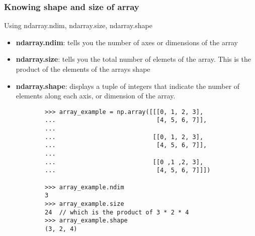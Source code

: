 \documentclass[12pt, a4paper]{article}
\begin{document}
\subsubsection{Knowing shape and size of array}
Using ndarray.ndim, ndarray.size, ndarray.shape

\begin{itemize}
    \item \textbf{ndarray.ndim}: tells you the number of axes or dimensions of the array
    \item \textbf{ndarray.size}: tells you the total number of elemets of the array. This is the product of the elements of the arrays shape
    \item \textbf{ndarray.shape}: displays a tuple of integers that indicate the number of elements along each axis, or dimension of the array.
    \begin{lstlisting}
        >>> array_example = np.array([[[0, 1, 2, 3],
        ...                            [4, 5, 6, 7]],
        ...
        ...                           [[0, 1, 2, 3],
        ...                            [4, 5, 6, 7]],
        ...
        ...                           [[0 ,1 ,2, 3],
        ...                            [4, 5, 6, 7]]])

        >>> array_example.ndim
        3
        >>> array_example.size
        24  // which is the product of 3 * 2 * 4
        >>> array_example.shape
        (3, 2, 4)

    \end{lstlisting}
\end{itemize}
\end{document}
